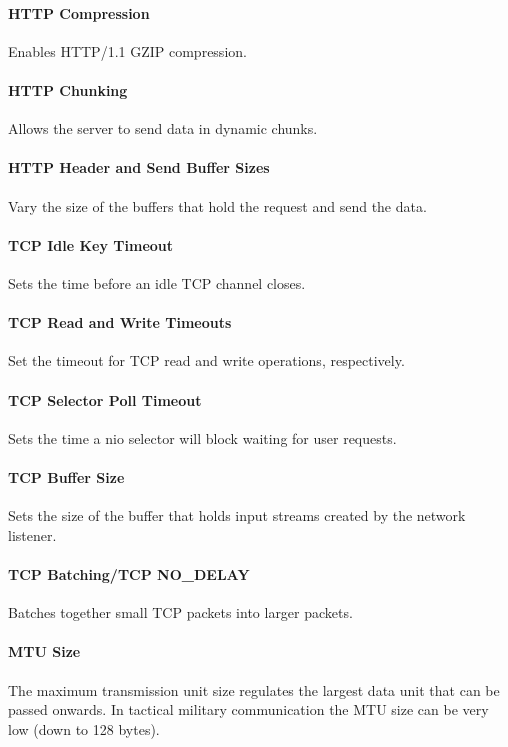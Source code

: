 \paragraph{HTTP Compression} Enables HTTP/1.1 GZIP compression.

\paragraph{HTTP Chunking} Allows the server to send data in dynamic chunks.

\paragraph{HTTP Header and Send Buffer Sizes} Vary the size of the buffers
that hold the request and send the data.

\paragraph{TCP Idle Key Timeout} Sets the time before an idle TCP channel
closes.

\paragraph{TCP Read and Write Timeouts} Set the timeout for TCP read and write
operations, respectively.

\paragraph{TCP Selector Poll Timeout} Sets the time a \gls{nio} selector will
block waiting for user requests.

\paragraph{TCP Buffer Size} Sets the size of the buffer that holds input streams
created by the network listener.

\paragraph{TCP Batching/TCP NO\_DELAY} Batches together small TCP packets into
larger packets.

\paragraph{MTU Size} The maximum transmission unit size regulates the largest
data unit that can be passed onwards. In tactical military communication the MTU
size can be very low (down to 128 bytes).

